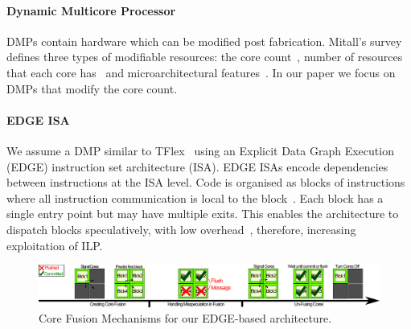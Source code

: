 \paragraph{Dynamic Multicore Processor} DMPs contain hardware which can be modified post fabrication.
Mitall's survey ~\cite{MittalSurv2016} defines three types of modifiable resources: the core count~\cite{ipek2007CoreFusion}, number of resources that each core has~\cite{Homayoun3DPooling2012} and microarchitectural features~\cite{fallinhetblock2014,BauerRSE08,tavanaElastic}.
In our paper we focus on DMPs that modify the core count.

\paragraph{EDGE ISA} We assume a DMP similar to TFlex~\cite{kim2007tflex} using an Explicit Data Graph Execution~\cite{burger04edge} (EDGE) instruction set architecture (ISA).
EDGE ISAs encode dependencies between instructions at the ISA level.
Code is organised as blocks of instructions where all instruction communication is local to the block~\cite{smith2006edge}.
Each block has a single entry point but may have multiple exits.
This enables the architecture to dispatch blocks speculatively, with low overhead~\cite{putnam2010e2,kim2007tflex}, therefore, increasing exploitation of ILP.

 \begin{figure}[t]
 \center
 \includegraphics[width=1\textwidth]{graphics/background/proc_test.pdf}
\vspace*{-5mm}
 \caption{Core Fusion Mechanisms for our EDGE-based architecture.}\label{fig:dmp}
\vspace{-5mm}
 \end{figure}

